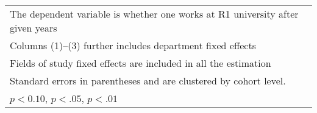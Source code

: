 \begin{table}[htbp]
\begin{adjustbox}{max width=0.7\textwidth}
\begin{tabular}{l*{6}{c}}
\hline\hline
\multicolumn{7}{l}{\footnotesize The dependent variable is whether one 	works at R1 university after given years}\\
\multicolumn{7}{l}{\footnotesize Columns (1)--(3) further includes department fixed effects}\\
\multicolumn{5}{l}{\footnotesize Fields of study fixed effects are included in all the estimation}\\
\multicolumn{7}{l}{\footnotesize Standard errors in parentheses and are clustered by cohort level.}\\
\multicolumn{7}{l}{\footnotesize \sym{*} \(p<0.10\), \sym{**} \(p<.05\), \sym{***} \(p<.01\)}\\
\end{tabular}%
	\end{adjustbox}
\end{table}